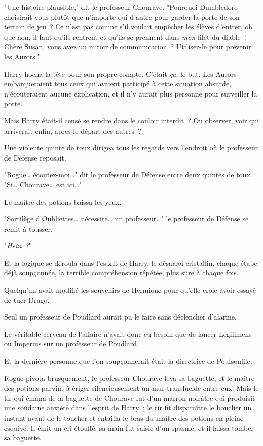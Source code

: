 "Une histoire plausible," dit le professeur Chourave. "Pourquoi Dumbledore choisirait vous plutôt que n'importe qui d'autre pour garder la porte de son terrain de jeu~? Ce n'est pas comme s'il voulait empêcher les élèves d'entrer, oh que non, il faut qu'ils rentrent et qu'ils se prennent dans \emph{mon} filet du diable~! Chère Susan, vous avez un miroir de communication~? Utilisez-le pour prévenir les Aurors."

Harry hocha la tête pour son propre compte. C'était \emph{ça}, le but. Les Aurors embarqueraient tous ceux qui avaient participé à cette situation absurde, n'écouteraient aucune explication, et il n'y aurait plus personne pour surveiller la porte.

Mais Harry était-il censé se rendre dans le couloir interdit~? Ou observer, voir qui arriverait enfin, après le départ des autres~?

Une violente quinte de toux dirigea tous les regards vers l'endroit où le professeur de Défense reposait.

"Rogue… écoutez-moi…" dit le professeur de Défense entre deux quintes de toux. "Si… Chourave… est ici…"

Le maître des potions baissa les yeux.

"Sortilège d'Oubliettes… nécessite… un professeur…" le professeur de Défense se remit à tousser.

"\emph{Hein~?}"

Et la logique se déroula dans l'esprit de Harry, le désarroi cristallin, chaque étape déjà soupçonnée, la terrible compréhension répétée, plus sûre à chaque fois.

Quelqu'un avait modifié les souvenirs de Hermione pour qu'elle croie avoir essayé de tuer Drago.

Seul un professeur de Poudlard aurait pu le faire sans déclencher d'alarme.

Le véritable cerveau de l'affaire n'avait donc eu besoin que de lancer Legilimens ou Imperius sur un professeur de Poudlard.

Et la dernière personne que l'on soupçonnerait était la directrice de Poufsouffle.

Rogue pivota brusquement, le professeur Chourave leva sa baguette, et le maître des potions parvint à ériger silencieusement un mur translucide entre eux. Mais le tir qui émana de la baguette de Chourave fut d'un marron noirâtre qui produisit une soudaine anxiété dans l'esprit de Harry~; le tir fit disparaître le bouclier un instant avant de le toucher et entailla le bras du maître des potions en pleine esquive. Il émit un cri étouffé, sa main fut saisie d'un spasme, et il laissa tomber sa baguette.

